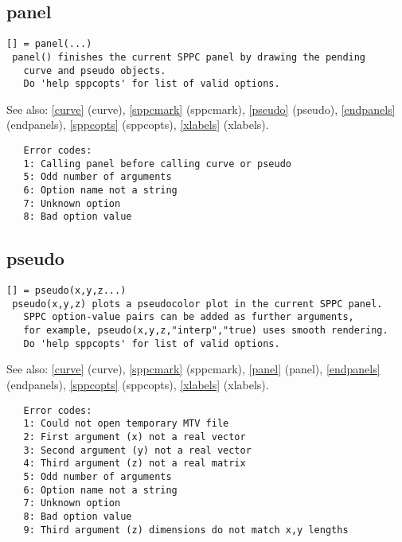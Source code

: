 \documentclass[a4paper]{article}
\begin{document}
\subsection{panel\label{panel}}

\begin{tscreen}
\begin{verbatim}
[] = panel(...)
 panel() finishes the current SPPC panel by drawing the pending
   curve and pseudo objects.
   Do 'help sppcopts' for list of valid options.
\end{verbatim}

See also: \ref{curve} {(curve)}, \ref{sppcmark} {(sppcmark)}, \ref{pseudo} {(pseudo)}, \ref{endpanels} {(endpanels)}, \ref{sppcopts} {(sppcopts)}, \ref{xlabels} {(xlabels)}.
\begin{verbatim}
   Error codes:
   1: Calling panel before calling curve or pseudo
   5: Odd number of arguments
   6: Option name not a string
   7: Unknown option
   8: Bad option value
\end{verbatim}
\end{tscreen}



\subsection{pseudo\label{pseudo}}

\begin{tscreen}
\begin{verbatim}
[] = pseudo(x,y,z...)
 pseudo(x,y,z) plots a pseudocolor plot in the current SPPC panel.
   SPPC option-value pairs can be added as further arguments,
   for example, pseudo(x,y,z,"interp","true) uses smooth rendering.
   Do 'help sppcopts' for list of valid options.
\end{verbatim}

See also: \ref{curve} {(curve)}, \ref{sppcmark} {(sppcmark)}, \ref{panel} {(panel)}, \ref{endpanels} {(endpanels)}, \ref{sppcopts} {(sppcopts)}, \ref{xlabels} {(xlabels)}.
\begin{verbatim}
   Error codes:
   1: Could not open temporary MTV file
   2: First argument (x) not a real vector
   3: Second argument (y) not a real vector
   4: Third argument (z) not a real matrix
   5: Odd number of arguments
   6: Option name not a string
   7: Unknown option
   8: Bad option value
   9: Third argument (z) dimensions do not match x,y lengths
\end{verbatim}
\end{tscreen}
\end{document}
